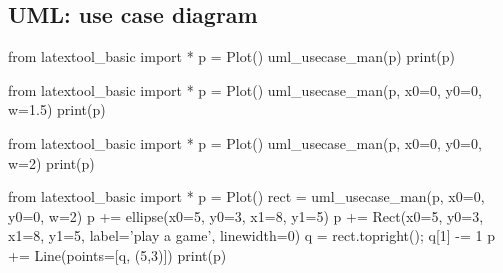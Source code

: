 \subsection{UML: use case diagram}

\begin{python}
from latextool_basic import *
p = Plot()
uml_usecase_man(p)
print(p)
\end{python}

\begin{python}
from latextool_basic import *
p = Plot()
uml_usecase_man(p, x0=0, y0=0, w=1.5)
print(p)
\end{python}

\begin{python}
from latextool_basic import *
p = Plot()
uml_usecase_man(p, x0=0, y0=0, w=2)
print(p)
\end{python}


\begin{python}
from latextool_basic import *
p = Plot()
rect = uml_usecase_man(p, x0=0, y0=0, w=2)
p += ellipse(x0=5, y0=3, x1=8, y1=5)
p += Rect(x0=5, y0=3, x1=8, y1=5, label='play a game', linewidth=0)
q = rect.topright(); q[1] -= 1
p += Line(points=[q, (5,3)])
print(p) 
\end{python}
